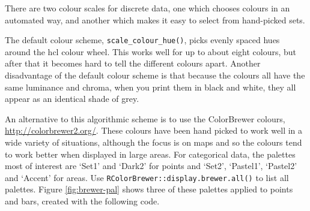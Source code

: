 There are two colour scales for discrete data, one which chooses colours
in an automated way, and another which makes it easy to select from
hand-picked sets.

The default colour scheme, \texttt{scale\_colour\_hue()}, picks evenly
spaced hues around the hcl colour wheel. This works well for up to about
eight colours, but after that it becomes hard to tell the different
colours apart. Another disadvantage of the default colour scheme is that
because the colours all have the same luminance and chroma, when you
print them in black and white, they all appear as an identical shade of
grey.  

An alternative to this algorithmic scheme is to use the ColorBrewer
colours, \url{http://colorbrewer2.org/}. These colours have been hand
picked to work well in a wide variety of situations, although the focus
is on maps and so the colours tend to work better when displayed in
large areas. For categorical data, the palettes most of interest are
`Set1' and `Dark2' for points and `Set2', `Pastel1', `Pastel2' and
`Accent' for areas. Use \texttt{RColorBrewer::display.brewer.all()} to
list all palettes. Figure \ref{fig:brewer-pal} shows three of these
palettes applied to points and bars, created with the following code.
 

\begin{Shaded}
\begin{Highlighting}[]
\StringTok{ }  \NormalTok{, }
   
\StringTok{ }\NormalTok{(}  
   \NormalTok{)}

\StringTok{ }\NormalTok{(} \NormalTok{)}
\StringTok{ }\NormalTok{(} \NormalTok{)  }
\StringTok{ }\NormalTok{(} \NormalTok{)}
\StringTok{ }\NormalTok{(} \NormalTok{)}
\StringTok{ }\NormalTok{(} \NormalTok{)}
\StringTok{ }\NormalTok{(} \NormalTok{)}
\end{Highlighting}
\end{Shaded}

